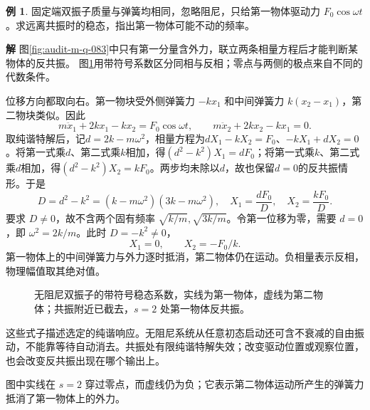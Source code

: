 \documentclass[11pt,openany,fontset=fandol]{ctexbook}
\theoremstyle{plain}\newtheorem{theorem}{定理}[chapter]\newtheorem{proposition}[theorem]{命题}
\theoremstyle{definition}\newtheorem{definition}{定义}[chapter]\newtheorem{example}{例}[chapter]
\theoremstyle{remark}\newtheorem*{remark}{说明}
\newcommand{\SolutionStart}{\par\nobreak\medskip\nobreak\noindent\textbf{解}\quad\ignorespaces}
\newenvironment{solution}{\SolutionStart}{\par\medskip}
\begin{document}
\begin{example}
固定端双振子质量与弹簧均相同，忽略阻尼，只给第一物体驱动力 $F_0\cos\omega t$。求远离共振时的稳态，指出第一物体可能不动的频率。
\end{example}

\begin{solution}
图\ref{fig:audit-m-q-083}中只有第一分量含外力，联立两条相量方程后才能判断某物体的反共振。
图\ref{fig:orig-070}用带符号系数区分同相与反相；零点与两侧的极点来自不同的代数条件。

位移方向都取向右。第一物块受外侧弹簧力 $-kx_1$ 和中间弹簧力 $k(x_2-x_1)$，第二物块类似。因此
\[
m\ddot x_1+2kx_1-kx_2=F_0\cos\omega t,
\qquad m\ddot x_2+2kx_2-kx_1=0.
\]
取纯谐特解后，记$d=2k-m\omega^2$，相量方程为$dX_1-kX_2=F_0$、$-kX_1+dX_2=0$。将第一式乘$d$、第二式乘$k$相加，得$(d^2-k^2)X_1=dF_0$；将第一式乘$k$、第二式乘$d$相加，得$(d^2-k^2)X_2=kF_0$。两步均未除以$d$，故也保留$d=0$的反共振情形。于是
\[
D=d^2-k^2=(k-m\omega^2)(3k-m\omega^2),
\quad X_1=\frac{dF_0}{D},\quad X_2=\frac{kF_0}{D}.
\]
要求 $D\ne0$，故不含两个固有频率 $\sqrt{k/m},\sqrt{3k/m}$。令第一位移为零，需要 $d=0$，即 $\omega^2=2k/m$。此时 $D=-k^2\ne0$，
\[
X_1=0,\qquad X_2=-F_0/k.
\]
第一物体上的中间弹簧力与外力逐时抵消，第二物体仍在运动。负相量表示反相，物理幅值取其绝对值。

\begin{figure}[H]\centering
{}
\caption{无阻尼双振子的带符号稳态系数，实线为第一物体，虚线为第二物体；共振附近已截去，$s=2$ 处第一物体反共振。}
\label{fig:orig-070}
\end{figure}

这些式子描述选定的纯谐响应。无阻尼系统从任意初态启动还可含不衰减的自由振动，不能靠等待自动消去。共振处有限纯谐特解失效；改变驱动位置或观察位置，也会改变反共振出现在哪个输出上。

图中实线在 $s=2$ 穿过零点，而虚线仍为负；它表示第二物体运动所产生的弹簧力抵消了第一物体上的外力。
\end{solution}
\end{document}
